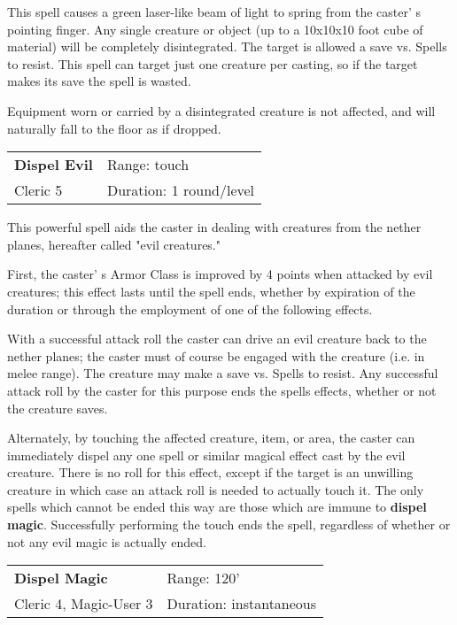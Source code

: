 \documentclass[a4paper,twoside,openany,10pt]{book}
\begin{document}
\begin{multicols}{2}
This spell causes a green laser-like beam of light to spring from the caster' s pointing finger. Any single creature or object (up to a 10x10x10 foot cube of material) will be completely disintegrated. The target is allowed a save vs. Spells to resist. This spell can target just one creature per casting, so if the target makes its save the spell is wasted.

Equipment worn or carried by a disintegrated creature is not affected, and will naturally fall to the floor as if dropped.


\smallskip\begin{flushleft} 
	\begin{tabularx}{0.45\textwidth}{@{}m{3.5cm}m{5.5cm}@{}} 
		\textbf{Dispel Evil} & Range: touch\\
Cleric 5 &Duration: 1 round/level\\
	\end{tabularx}\end{flushleft}

This powerful spell aids the caster in dealing with creatures from the nether planes, hereafter called "evil creatures."

First, the caster' s Armor Class is improved by 4 points when attacked by evil creatures; this effect lasts until the spell ends, whether by expiration of the duration or through the employment of one of the following effects.

With a successful attack roll the caster can drive an evil creature back to the nether planes; the caster must of course be engaged with the creature (i.e. in melee range). The creature may make a save vs. Spells to resist. Any successful attack roll by the caster for this purpose ends the spells effects, whether or not the creature saves.

Alternately, by touching the affected creature, item, or area, the caster can immediately dispel any one spell or similar magical effect cast by the evil creature. There is no roll for this effect, except if the target is an unwilling creature in which case an attack roll is needed to actually touch it. The only spells which cannot be ended this way are those which are immune to \textbf{dispel magic}. Successfully performing the touch ends the spell, regardless of whether or not any evil magic is actually ended.

\smallskip\begin{flushleft} 
	\begin{tabularx}{0.45\textwidth}{@{}m{3.5cm}m{5.5cm}@{}} 
		\textbf{Dispel Magic} & Range: 120'\\
Cleric 4, Magic-User 3 & Duration: instantaneous\\
	\end{tabularx}\end{flushleft}



\end{multicols}
\end{document}
